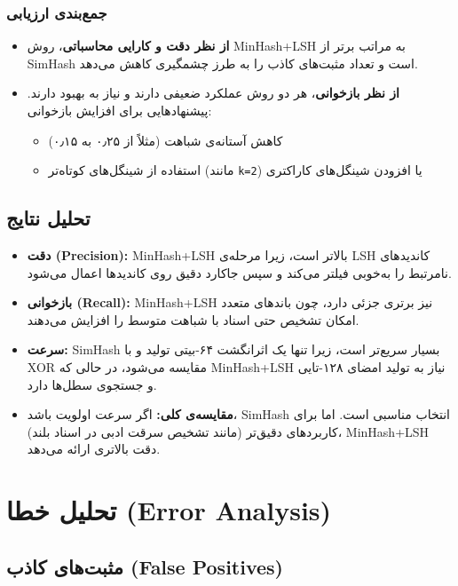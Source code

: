 \documentclass[12pt,a4paper]{article}
\begin{document}
\subsubsection*{جمع‌بندی ارزیابی}

\begin{itemize}
    \item \textbf{از نظر دقت و کارایی محاسباتی}، روش MinHash+LSH به مراتب برتر از SimHash است و تعداد مثبت‌های کاذب را به طرز چشمگیری کاهش می‌دهد.
    \item \textbf{از نظر بازخوانی}، هر دو روش عملکرد ضعیفی دارند و نیاز به بهبود دارند. پیشنهادهایی برای افزایش بازخوانی:
    \begin{itemize}
        \item کاهش آستانه‌ی شباهت (مثلاً از ۰٫۲۵ به ۰٫۱۵)
        \item استفاده از شینگل‌های کوتاه‌تر (مانند \texttt{k=2}) یا افزودن شینگل‌های کاراکتری
    \end{itemize}
\end{itemize}

\subsection{تحلیل نتایج}

\begin{itemize}
    \item \textbf{دقت (Precision):} MinHash+LSH بالاتر است، زیرا مرحله‌ی LSH کاندیدهای نامرتبط را به‌خوبی فیلتر می‌کند و سپس جاکارد دقیق روی کاندیدها اعمال می‌شود.
    \item \textbf{بازخوانی (Recall):} MinHash+LSH نیز برتری جزئی دارد، چون باندهای متعدد امکان تشخیص حتی اسناد با شباهت متوسط را افزایش می‌دهند.
    \item \textbf{سرعت:} SimHash بسیار سریع‌تر است، زیرا تنها یک اثرانگشت ۶۴-بیتی تولید و با XOR مقایسه می‌شود، در حالی که MinHash+LSH نیاز به تولید امضای ۱۲۸-تایی و جستجوی سطل‌ها دارد.
    \item \textbf{مقایسه‌ی کلی:} اگر سرعت اولویت باشد، SimHash انتخاب مناسبی است. اما برای کاربردهای دقیق‌تر (مانند تشخیص سرقت ادبی در اسناد بلند)، MinHash+LSH دقت بالاتری ارائه می‌دهد.
\end{itemize}

\section{تحلیل خطا (Error Analysis)}

\subsection{مثبت‌های کاذب (False Positives)}
\end{document}
